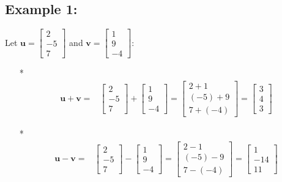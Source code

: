 \documentclass{article}
\begin{document}
\subsection*{Example 1:}

Let \(\mathbf{u} = \begin{bmatrix} 2 \\ -5 \\ 7 \end{bmatrix}\) and \(\mathbf{v} = \begin{bmatrix} 1 \\ 9 \\ -4 \end{bmatrix}\):
\begin{itemize}
\item[*] \begin{align*}
\mathbf{u} + \mathbf{v} = & \begin{bmatrix} 2 \\ -5 \\ 7 \end{bmatrix} + \begin{bmatrix} 1 \\ 9 \\ -4 \end{bmatrix} 
= \begin{bmatrix} 2 + 1 \\ (-5) + 9 \\ 7 + (-4) \end{bmatrix} = \begin{bmatrix} 3 \\ 4 \\ 3 \end{bmatrix}
\end{align*}
\item[*] \begin{align*}
\mathbf{u} - \mathbf{v} = & \begin{bmatrix} 2 \\ -5 \\ 7 \end{bmatrix} - \begin{bmatrix} 1 \\ 9 \\ -4 \end{bmatrix} 
= \begin{bmatrix} 2 - 1 \\ (-5) - 9 \\ 7 - (-4) \end{bmatrix} = \begin{bmatrix} 1 \\ -14 \\ 11 \end{bmatrix}

\end{align*}
\end{itemize}
\end{document}
